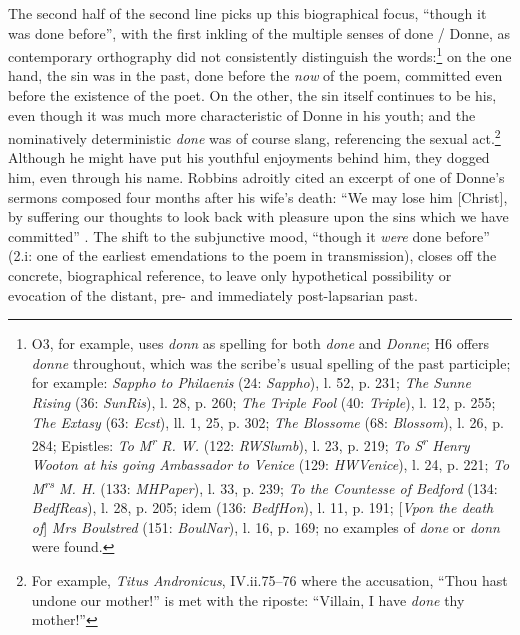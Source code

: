 \begin{paper}
The second half of the second line picks up this biographical focus,
``though it was done before'', with the first inkling of the multiple
senses of done / Donne, as contemporary orthography did not consistently
distinguish the words:\footnote{O3, for example, uses \emph{donn} as
  spelling for both \emph{done} and \emph{Donne}; H6 offers \emph{donne}
  throughout, which was the scribe's usual spelling of the past
  participle; for example: \emph{Sappho to Philaenis} (24:
  \emph{Sappho}), l. 52, p. 231; \emph{The Sunne Rising} (36:
  \emph{SunRis}), l. 28, p. 260; \emph{The Triple Fool} (40:
  \emph{Triple}), l. 12, p. 255; \emph{The Extasy} (63: \emph{Ecst}),
  ll. 1, 25, p. 302; \emph{The Blossome} (68: \emph{Blossom}), l. 26, p.
  284; Epistles: \emph{To M\textsuperscript{r} R. W.} (122:
  \emph{RWSlumb}), l. 23, p. 219; \emph{To S\textsuperscript{r} Henry
  Wooton at his going Ambassador to Venice} (129: \emph{HWVenice}), l.
  24, p. 221; \emph{To M\textsuperscript{rs} M. H.} (133:
  \emph{MHPaper}), l. 33, p. 239; \emph{To the Countesse of Bedford}
  (134: \emph{BedfReas}), l. 28, p. 205; idem (136: \emph{BedfHon}), l.
  11, p. 191; {[}\emph{Vpon the death of}{]} \emph{Mrs Boulstred} (151:
  \emph{BoulNar}), l. 16, p. 169; no examples of \emph{done} or
  \emph{donn} were found.} on the one hand, the sin was in the past,
done before the \emph{now} of the poem, committed even before the
existence of the poet. On the other, the sin itself continues to be his,
even though it was much more characteristic of Donne in his youth; and
the nominatively deterministic \emph{done} was of course slang,
referencing the sexual act.\footnote{For example, \emph{Titus
  Andronicus}, IV.ii.75--76 where the accusation, ``Thou hast undone our
  mother!'' is met with the riposte: ``Villain, I have \emph{done} thy
  mother!''} Although he might have put his youthful enjoyments behind
him, they dogged him, even through his name. Robbins adroitly cited an
excerpt of one of Donne's sermons composed four months after his wife's
death: ``We may lose him {[}Christ{]}, by suffering our thoughts to look
back with pleasure upon the sins which we have committed'' \citep[90; citing Sermon 1.245 on Proverbs 8:17]{robbins_complete_2013}. The shift to the
subjunctive mood, ``though it \emph{were} done before'' (2.i: one of the
earliest emendations to the poem in transmission), closes off the
concrete, biographical reference, to leave only hypothetical possibility
or evocation of the distant, pre- and immediately post-lapsarian past.


\end{paper}
